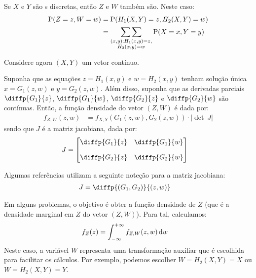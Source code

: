 Se $X$ e $Y$ são \va s discretas, então $Z$ e $W$
também são. Neste caso:
\begin{align*}
    \operatorname{P}(Z = z, W = w) &= \operatorname{P}(H_1(X, Y) = z, H_2(X, Y) = w) \\
    &= \underset{\substack{(x,y) : H_1(x, y) = z,\\
        H_2(x, y) = w}} {\sum\sum} \operatorname{P}(X = x, Y = y)
\end{align*}

Considere agora $(X, Y)$ um vetor contínuo.

\begin{theorem}\label{def:ch04-metodo-jac-vetor}
    Suponha que as equações $z = H_1(x, y)$ e $w = H_2(x, y)$
    tenham solução única $x = G_1(z, w)$ e $y = G_2(z, w)$. Além
    disso, suponha que as derivadas parciais $\diffp{G_1}{z}$,
    $\diffp{G_1}{w}$, $\diffp{G_2}{z}$ e $\diffp{G_2}{w}$
    são contínuas. Então, a função densidade do vetor $(Z, W)$
    é dada por:
    \begin{align}
        f_{Z,W}(z, w) &= f_{X, Y}(G_1(z, w), G_2(z, w))
            \cdot |\det\ J|
        \label{eq:ch04-metodo-jac-vetor}
    \end{align}
    sendo que $J$ é a matriz jacobiana, dada por:
    \begin{align*}
        J &= \begin{bmatrix}
            \diffp{G_1}{z} & \diffp{G_1}{w} \\[10pt]
            \diffp{G_2}{z} & \diffp{G_2}{w} \\
        \end{bmatrix}
    \end{align*}
\end{theorem}

\begin{notation}
    Algumas referências utilizam a seguinte noteção
    para a matriz jacobiana:
    \begin{align*}
        J &= \diffp{{(G_1, G_2)}}{{(z, w)}}
    \end{align*}
\end{notation}

Em alguns problemas, o objetivo é obter a função densidade
de $Z$ (que é a densidade marginal em $Z$ do vetor $(Z, W)$).
Para tal, calculamos:
\begin{align*}
    f_Z(z) &= \int_{-\infty}^{+\infty} f_{Z, W}(z, w) \,\mathrm{d} w
\end{align*}
Neste caso, a variável $W$ representa uma transformação
auxiliar que é escolhida para facilitar os cálculos.
Por exemplo, podemos escolher $W = H_2(X, Y) = X$ ou
$W = H_2(X, Y) = Y$.

